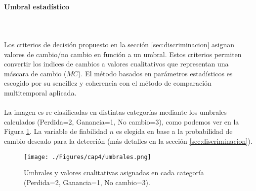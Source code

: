 \paragraph{Umbral estad\'istico}\mbox{}\\\mbox{}\\
Los criterios de decisi\'on propuesto en la secci\'on \ref{sec:discriminacion} asignan valores de cambio/no cambio en funci\'on a un umbral. Estos criterios permiten convertir los indices de cambios a valores cualitativos que representan una m\'ascara de cambio ($ MC $). El m\'etodo basados en par\'ametros estad\'isticos es escogido por su sencillez y coherencia con el m\'etodo de comparaci\'on multitemporal aplicada. \\~\\
La imagen es re-clasificadas en distintas categor\'ias mediante los umbrales calculados (Perdida=2, Ganancia=1, No cambio=3), como podemos ver en la Figura \ref{fig:umbrales}.  La variable de fiabilidad $ n $ es elegida en base a la probabilidad de cambio deseado para la detecci\'on (m\'as detalles en la secci\'on \ref{sec:discriminacion}).
	\begin{figure}[H]
		\centering
		\texttt{[image: ./Figures/cap4/umbrales.png]}
		\caption{Umbrales y valores cualitativas asignadas en cada categor\'ia (Perdida=2, Ganancia=1, No cambio=3).}
		\label{fig:umbrales}
	\end{figure}

